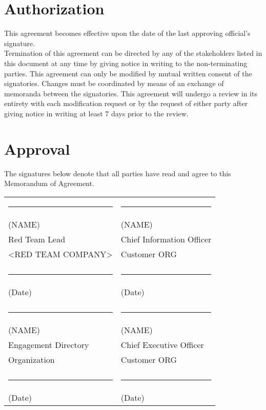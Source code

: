 \documentclass[12pt,letterpaper]{article}
\begin{document}
\section{Authorization}
This agreement becomes effective upon the date of the last approving official's signature.\\
Termination of this agreement can be directed by any of the stakeholders listed in this document at any time by giving notice in writing to the non-terminating parties. This agreement can only be modified by mutual written consent of the signatories. Changes must be coordinated by means of an exchange of memoranda between the signatories. This agreement will undergo a review in its entirety with each modification request or by the request of either party after giving notice in writing at least 7 days prior to the review.

\section{Approval}
The signatures below denote that all parties have read and agree to this Memorandum of Agreement.

\vspace{1cm}
\begin{tabular}{p{6cm}p{6cm}}
\rule{6cm}{0.4pt} & \rule{6cm}{0.4pt} \\
(NAME) & (NAME) \\
Red Team Lead & Chief Information Officer \\
<RED TEAM COMPANY> & Customer ORG \\
\vspace{0.5cm} & \vspace{0.5cm} \\
\rule{6cm}{0.4pt} & \rule{6cm}{0.4pt} \\
(Date) & (Date) \\
\vspace{1cm} & \vspace{1cm} \\
\rule{6cm}{0.4pt} & \rule{6cm}{0.4pt} \\
(NAME) & (NAME) \\
Engagement Directory & Chief Executive Officer \\
Organization & Customer ORG \\
\vspace{0.5cm} & \vspace{0.5cm} \\
\rule{6cm}{0.4pt} & \rule{6cm}{0.4pt} \\
(Date) & (Date) \\
\end{tabular}
\end{document}
